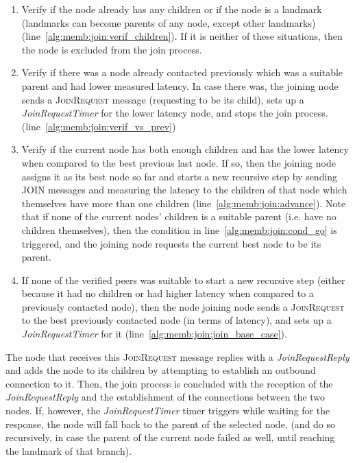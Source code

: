 \begin{enumerate}
    \item Verify if the node already has any children or if the node is a landmark (landmarks can become parents of any node, except other landmarks) (line~\ref{alg:memb:join:verif_children}). If it is neither of these situations, then the node is excluded from the join process. 
    
    \item Verify if there was a node already contacted previously which was a suitable parent and had lower measured latency. In case there was, the joining node sends a \textsc{JoinRequest} message (requesting to be its child), sets up a \textit{JoinRequestTimer} for the lower latency node, and stops the join process. (line~\ref{alg:memb:join:verif_vs_prev})

    \item Verify if the current node has both enough children and has the lower latency when compared to the best previous last node. If so, then the joining node assigns it as its best node so far and starts a new recursive step by sending JOIN messages and measuring the latency to the children of that node which themselves have more than one children (line~\ref{alg:memb:join:advance}). Note that if none of the current nodes' children is a suitable parent (i.e. have no children themselves), then the condition in line~\ref{alg:memb:join:cond_go} is triggered, and the joining node requests the current best node to be its parent.
    
    \item If none of the verified peers was suitable to start a new recursive step (either because it had no children or had higher latency when compared to a previously contacted node), then the node joining node sends a \textsc{JoinRequest} to the best previously contacted node (in terms of latency), and sets up a \textit{JoinRequestTimer} for it  (line~\ref{alg:memb:join:join_base_case}). 
\end{enumerate}



The node that receives this \textsc{JoinRequest} message replies with a \textit{JoinRequestReply} and adds the node to its children by attempting to establish an outbound connection to it. Then, the join process is concluded with the reception of the \textit{JoinRequestReply} and the establishment of the connections between the two nodes. If, however, the \textit{JoinRequestTimer} timer triggers while waiting for the response, the node will fall back to the parent of the selected node, (and do so recursively, in case the parent of the current node failed as well, until reaching the landmark of that branch).

